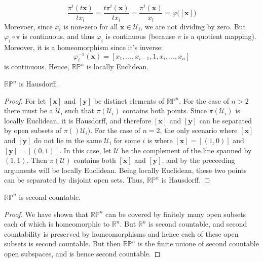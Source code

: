\documentclass{article}                                                        %
\begin{document}
\begin{example}
\begin{equation}
                    \frac{\pi^{i}(t\mathbf{x})}{tx_{i}}
                    =\frac{t\pi^{i}(\mathbf{x})}{tx_{i}}
                    =\frac{\pi^{i}(\mathbf{x})}{x_{i}}
                    =\varphi\big([\mathbf{x}]\big)
            \end{equation}
            Morevoer, since $x_{i}$ is non-zero for all
            $\mathbf{x}\in\mathcal{U}_{i}$, we are not dividing by zero.
            But $\varphi_{i}\circ\pi$ is continuous, and thus $\varphi_{i}$ is
            continuous (because $\pi$ is a quotient mapping). Moreover, it is a
            homeomorphism since it's inverse:
            \begin{equation}
                \varphi_{i}^{\minus{1}}(\mathbf{x})=
                    [x_{1},\dots,x_{i-1},1,x_{i},\dots,x_{n}]
            \end{equation}
            is continuous. Hence, $\mathbb{RP}^{n}$ is locally Euclidean.
        \end{example}
        \begin{theorem}
            $\mathbb{RP}^{n}$ is Hausdorff.
        \end{theorem}
        \begin{proof}
            For let $[\mathbf{x}]$ and $[\mathbf{y}]$ be distinct elements of
            $\mathbb{RP}^{n}$. For the case of $n>2$ there must be a
            $\mathcal{U}_{i}$ such that $\pi(\mathcal{U}_{i})$ contains both
            points. Since $\pi(\mathcal{U}_{i})$ is locally Euclidean, it is
            Hausdorff, and therefore $[\mathbf{x}]$ and $[\mathbf{y}]$ can be
            separated by open subsets of $\pi()\mathcal{U}_{i})$. For the case
            of $n=2$, the only scenario where $[\mathbf{x}]$ and $[\mathbf{y}]$
            do not lie in the same $\mathcal{U}_{i}$ for some $i$ is where
            $[\mathbf{x}]=[(1,0)]$ and $[\mathbf{y}]=[(0,1)]$. In this case,
            let $\mathcal{U}$ be the complement of the line spanned by
            $(1,1)$. Then $\pi(\mathcal{U})$ contains both $[\mathbf{x}]$ and
            $[\mathbf{y}]$, and by the preceeding arguments will be locally
            Euclidean. Being locally Euclidean, these two points can be
            separated by disjoint open sets. Thus, $\mathbb{RP}^{n}$ is
            Hausdorff.
        \end{proof}
        \begin{theorem}
            $\mathbb{RP}^{n}$ is second countable.
        \end{theorem}
        \begin{proof}
            We have shown that $\mathbb{RP}^{n}$ can be covered by finitely many
            open subsets each of which is homeomorphic to $\mathbb{R}^{n}$.
            But $\mathbb{R}^{n}$ is second countable, and second countability is
            preserved by homeomorphisms and hence each of these open subsets is
            second countable. But then $\mathbb{RP}^{n}$ is the finite unione of
            second countable open subspaces, and is hence second countable.
        \end{proof}
\end{document}
